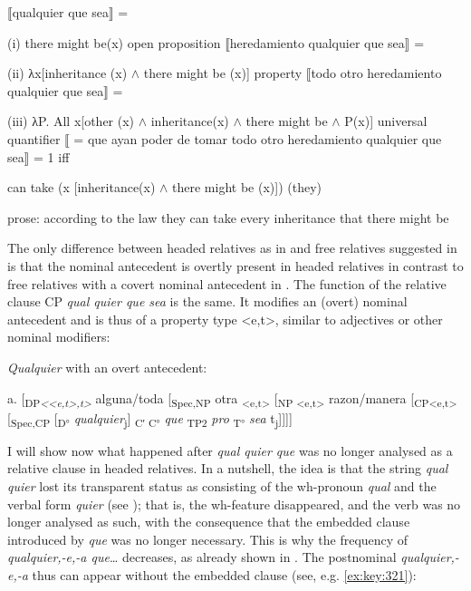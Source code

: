 \ea \label{ex:key:319}
\ea{} \label{ex:key:319-1}  ⟦qualquier que sea⟧ =

    (i) there might be(x) \hfill open proposition
\ex{} \label{ex:key:319-2} ⟦heredamiento qualquier que sea⟧ =

    (ii) λx[inheritance (x) ${\wedge}$ there might be (x)] \hfill property
\ex{} \label{ex:key:319-3} ⟦todo otro heredamiento qualquier que sea⟧ =

    (iii) λP. All x[other (x) ${\wedge}$ inheritance(x) ${\wedge}$ there might be ${\wedge}$ P(x)]  universal quantifier
\ex{} \label{ex:key:319-4} ⟦ = que ayan poder de tomar todo otro heredamiento qualquier que sea⟧ = 1 iff

    can take (\forall x [inheritance(x) ${\wedge}$ there might be (x)]) (they)

    prose: according to the law they can take every inheritance that there might be
\z
\z

The only difference between headed relatives as in  and free relatives suggested in  is that the nominal antecedent is overtly present in headed relatives in contrast to free relatives with a covert nominal antecedent in . The function of the relative clause CP \textit{qual quier que sea} is the same. It modifies an (overt) nominal antecedent and is thus of a property type <e,t>, similar to adjectives or other nominal modifiers:

\ea \label{ex:key:320} %
  \textit{Qualquier} with an overt antecedent:

  a. [\textsubscript{DP}\textit{\textsubscript{<{}<e,t>,t>}} alguna/toda [\textsubscript{Spec,NP} otra \textsubscript{<e,t>} [\textsubscript{NP <e,t>} razon/manera [\textsubscript{CP<e,t>} [\textsubscript{Spec,CP} [\textsubscript{D°} \textit{qualquier}\textsubscript{j}] \textsubscript{C′ C°} \textit{que} \textsubscript{TP2} \textit{pro\textsubscript{} }\textsubscript{T°} \textit{sea} t\textsubscript{j}]]]]

\z

I will show now what happened after \textit{qual quier que} was no longer analysed as a relative clause in headed relatives. In a nutshell, the idea is that the string \textit{qual quier} lost its transparent status as consisting of the wh-pronoun \textit{qual} and the verbal form \textit{quier} (see ); that is, the wh-feature disappeared, and the verb was no longer analysed as such, with the consequence that the embedded clause introduced by \textit{que} was no longer necessary. This is why the frequency of \textit{qualquier,-e,-a que}… decreases, as already shown in . The postnominal \textit{qualquier,-e,-a} thus can appear without the embedded clause (see, e.g. \ref{ex:key:321}):

